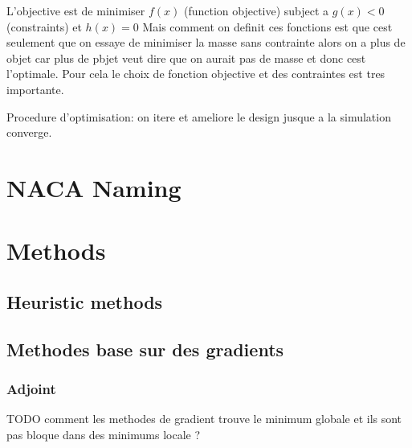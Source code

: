 \documentclass[12pt, a4paper]{article}%
\begin{document}
L'objective est de minimiser $f(x)$ (function objective) subject a $g(x)<0$ (constraints) et  $h(x)=0$ 
Mais comment on definit ces fonctions est que cest seulement que on essaye de minimiser la masse sans contrainte alors on a plus de objet car plus de pbjet veut dire que on aurait pas de masse et donc cest l'optimale. Pour cela le choix de fonction objective et des contraintes est tres importante. 

Procedure d'optimisation: on itere et ameliore le design jusque a la simulation converge. 




\newpage
\thispagestyle{empty}
\nocite{*}
\printbibliography[title = Bibliographie] %



\newpage
\appendix
\renewcommand{\thefigure}{A\arabic{figure}}
\setcounter{figure}{0}

\section{NACA Naming}
\section{Methods}
\subsection{Heuristic methods}
\subsection{Methodes base sur des gradients} \label{grad_methods}
\subsubsection{Adjoint}
% 
TODO comment les methodes de gradient trouve le minimum globale et ils sont pas bloque dans des minimums locale ?
\end{document}
